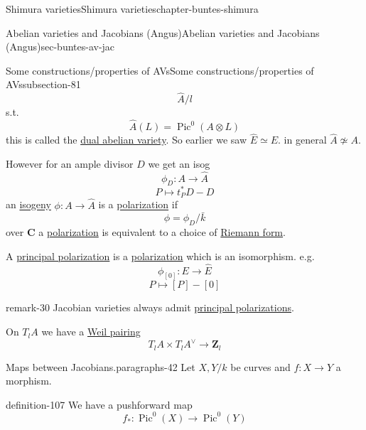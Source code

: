 \documentclass[oneside,10pt,]{book}
\numberwithin{equation}{section}
\newcommand{\ZZ}{\mathbf{Z}}
\newcommand{\CC}{\mathbf{C}}
\DeclareMathOperator{\Pic}{Pic}
\begin{document}
\begin{chapterptx}{Shimura varieties}{}{Shimura varieties}{}{}{chapter-buntes-shimura}
\begin{sectionptx}{Abelian varieties and Jacobians (Angus)}{}{Abelian varieties and Jacobians (Angus)}{}{}{sec-buntes-av-jac}
\begin{subsectionptx}{Some constructions/properties of AVs}{}{Some constructions/properties of AVs}{}{}{subsection-81}
\begin{equation*}
\hat A/l
\end{equation*}
s.t.%
\begin{equation*}
\hat A (L) = \Pic^0(A \otimes L)
\end{equation*}
this is called the \hyperref[def-dual-abvar]{dual abelian variety}. So earlier we saw \(\hat E \simeq E\). in general \(\hat A \not \simeq  A\).%
\par
\hypertarget{p-1111}{}%
However for an ample divisor \(D\) we get an isog%
\begin{equation*}
\phi_D \colon A \to \hat A
\end{equation*}
%
\begin{equation*}
P \mapsto t_P^* D -D
\end{equation*}
an \hyperref[def-supersing-isog-isog]{isogeny} \(\phi\colon A\to \hat A\) is a \hyperref[def-c-pol]{polarization} if%
\begin{equation*}
\phi =  \phi_D /\bar k
\end{equation*}
over \(\CC\)  a \hyperref[def-c-pol]{polarization} is equivalent to a choice of \hyperref[def-riemann-form]{Riemann form}.%
\par
\hypertarget{p-1112}{}%
A \hyperref[def-polarization]{principal polarization} is a \hyperref[def-c-pol]{polarization} which is an isomorphism. e.g.%
\begin{equation*}
\phi_{[0]} \colon E \to \hat E
\end{equation*}
%
\begin{equation*}
P \mapsto [P] - [0]
\end{equation*}
%
\begin{remark}{}{remark-30}%
\hypertarget{p-1113}{}%
Jacobian varieties always admit \hyperref[def-polarization]{principal polarizations}.%
\end{remark}
\hypertarget{p-1114}{}%
On \(T_lA \) we have  a \hyperref[prop-weil-pair]{Weil pairing}%
\begin{equation*}
T_lA \times T_lA^\vee \to \ZZ_l
\end{equation*}
%
\begin{paragraphs}{Maps between Jacobians.}{paragraphs-42}%
\hypertarget{p-1115}{}%
Let \(X,Y/k\) be curves and \(f\colon X \to Y\) a morphism.%
\begin{definition}{}{definition-107}%
\hypertarget{p-1116}{}%
We have a pushforward map%
\begin{equation*}
f_*\colon \Pic^0(X) \to \Pic^0(Y)
\end{equation*}

\end{definition}
\end{paragraphs}
\end{subsectionptx}
\end{sectionptx}
\end{chapterptx}
\end{document}
